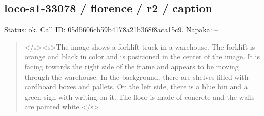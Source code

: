 \documentclass[10pt,a4paper]{article}
\begin{document}
\subsection*{loco-s1-33078 / florence / r2 / caption}
Status: ok. Call ID: 05d5606cb59b4178a21b368f8aca15c9. Napaka: --
\begin{quote}\footnotesize
</s>\allowbreak{}<s>\allowbreak{}The image shows a forklift truck in a warehouse. The forklift is orange and black in color and is positioned in the center of the image. It is facing towards the right side of the frame and appears to be moving through the warehouse. In the background,\allowbreak{} there are shelves filled with cardboard boxes and pallets. On the left side,\allowbreak{} there is a blue bin and a green sign with writing on it. The floor is made of concrete and the walls are painted white.</s>\allowbreak{}
\end{quote}
\end{document}

